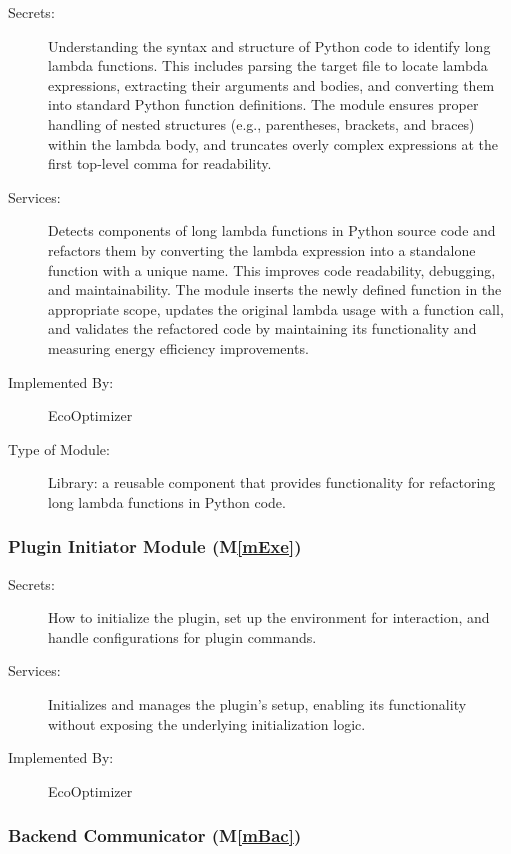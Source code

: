 \documentclass[12pt, titlepage]{article}
\newcommand{\mref}[1]{M\ref{#1}}
\begin{document}
\begin{description} 
  \item[Secrets:] Understanding the syntax and structure of Python code to identify long lambda functions. This includes parsing the target file to locate lambda expressions, extracting their arguments and bodies, and converting them into standard Python function definitions. The module ensures proper handling of nested structures (e.g., parentheses, brackets, and braces) within the lambda body, and truncates overly complex expressions at the first top-level comma for readability.

  \item[Services:] Detects components of long lambda functions in Python source code and refactors them by converting the lambda expression into a standalone function with a unique name. This improves code readability, debugging, and maintainability. The module inserts the newly defined function in the appropriate scope, updates the original lambda usage with a function call, and validates the refactored code by maintaining its functionality and measuring energy efficiency improvements.

  \item[Implemented By:] EcoOptimizer
  
  \item[Type of Module:] Library: a reusable component that provides functionality for refactoring long lambda functions in Python code.
\end{description}

\subsubsection{Plugin Initiator Module (\mref{mExe})}


\begin{description}
    \item[Secrets:] How to initialize the plugin, set up the environment for interaction, and handle configurations for plugin commands.
    \item[Services:] Initializes and manages the plugin's setup, enabling its functionality without exposing the underlying initialization logic.
    \item[Implemented By:] EcoOptimizer
\end{description}

\subsubsection{Backend Communicator (\mref{mBac})}
\end{document}

